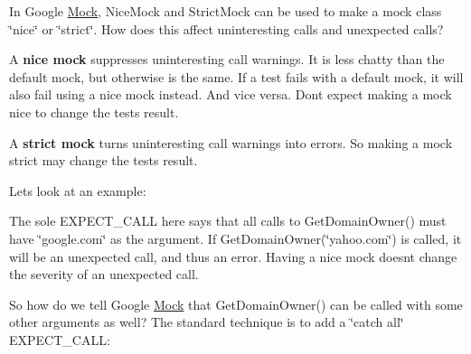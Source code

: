 In Google \mbox{\hyperlink{class_mock}{Mock}}, {\ttfamily Nice\+Mock} and {\ttfamily Strict\+Mock} can be used to make a mock class \char`\"{}nice\char`\"{} or \char`\"{}strict\char`\"{}. How does this affect uninteresting calls and unexpected calls?

A {\bfseries{nice mock}} suppresses uninteresting call warnings. It is less chatty than the default mock, but otherwise is the same. If a test fails with a default mock, it will also fail using a nice mock instead. And vice versa. Don\textquotesingle{}t expect making a mock nice to change the test\textquotesingle{}s result.

A {\bfseries{strict mock}} turns uninteresting call warnings into errors. So making a mock strict may change the test\textquotesingle{}s result.

Let\textquotesingle{}s look at an example\+:


\begin{DoxyCode}{0}
\DoxyCodeLine{}
\DoxyCodeLine{  \textcolor{comment}{// Use mock\_registry in code under test.}}
\DoxyCodeLine{\}}
\end{DoxyCode}


The sole {\ttfamily E\+X\+P\+E\+C\+T\+\_\+\+C\+A\+LL} here says that all calls to {\ttfamily Get\+Domain\+Owner()} must have {\ttfamily \char`\"{}google.\+com\char`\"{}} as the argument. If {\ttfamily Get\+Domain\+Owner(\char`\"{}yahoo.\+com\char`\"{})} is called, it will be an unexpected call, and thus an error. Having a nice mock doesn\textquotesingle{}t change the severity of an unexpected call.

So how do we tell Google \mbox{\hyperlink{class_mock}{Mock}} that {\ttfamily Get\+Domain\+Owner()} can be called with some other arguments as well? The standard technique is to add a \char`\"{}catch all\char`\"{} {\ttfamily E\+X\+P\+E\+C\+T\+\_\+\+C\+A\+LL}\+:


